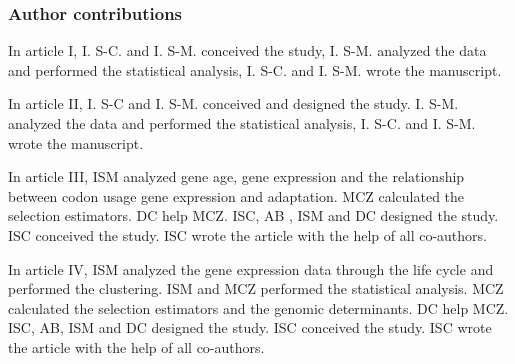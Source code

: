  \vspace{2cm}
\subsubsection{Author contributions}
\small{
In article I, I. S-C. and I. S-M. conceived the study, I. S-M. analyzed the data and performed the statistical analysis, I. S-C. and I. S-M. wrote the manuscript. 

In article II, I. S-C and I. S-M. conceived and designed the study. I. S-M. analyzed the data and performed the statistical analysis, I. S-C. and I. S-M. wrote the manuscript. 

In article III, ISM analyzed gene age, gene expression and the relationship between codon usage gene expression and adaptation. MCZ calculated the selection estimators. DC help MCZ. ISC, AB , ISM and DC designed the study. ISC conceived the study. ISC wrote the article with the help of all co-authors.

In article IV, ISM analyzed the gene expression data through the life cycle and performed the clustering. ISM and MCZ performed the statistical analysis. MCZ calculated the selection estimators and the genomic determinants. DC help MCZ. ISC, AB, ISM and DC designed the study. ISC conceived the study. ISC wrote the article with the help of all co-authors. 
}